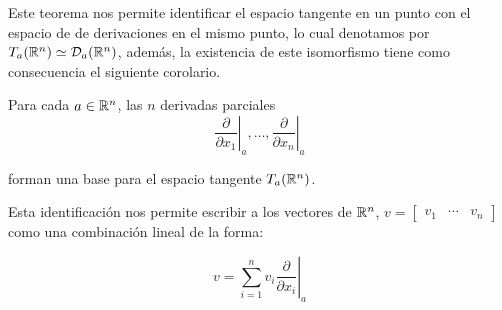 Este teorema nos permite identificar el espacio tangente en un punto con el espacio de de derivaciones en el mismo punto, lo cual denotamos por $T_a(\mathbb{R}^n) \simeq \mathcal{D}_a(\mathbb{R}^n)$, además, la existencia de este isomorfismo tiene como consecuencia el siguiente corolario.

\begin{corollary}\label{Corolario: Base de TpRn}
	Para cada $a \in \mathbb{R}^n$, las $n$ derivadas parciales
	\[
		\left. \frac{\partial }{\partial x_1} \right|_{a}, \dots, \left. \frac{\partial }{\partial x_n} \right|_{a}
	\]

	forman una base para el espacio tangente $T_a(\mathbb{R}^n)$.
\end{corollary}

Esta identificación nos permite escribir a los vectores de $\mathbb{R}^n$, $v = \begin{bmatrix} v_1 & \cdots & v_n \end{bmatrix}$ como una combinación lineal de la forma:

\[
  v = \left. \sum_{i = 1}^{n} v_i \frac{\partial}{\partial x_i} \right|_{a}
\]
